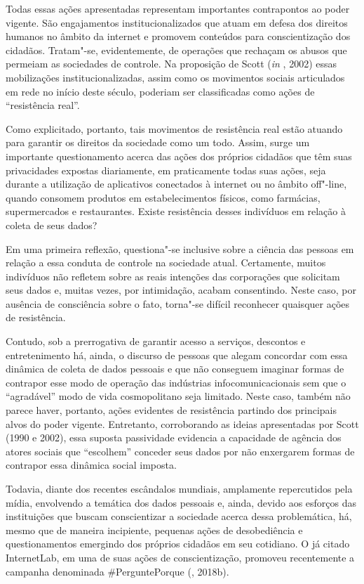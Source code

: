Todas essas ações apresentadas representam importantes contrapontos ao
poder vigente. São engajamentos institucionalizados que atuam em defesa
dos direitos humanos no âmbito da internet e promovem conteúdos para
conscientização dos cidadãos. Tratam"-se, evidentemente, de operações que
rechaçam os abusos que permeiam as sociedades de controle. Na proposição
de Scott (\emph{in} , 2002) essas mobilizações
institucionalizadas, assim como os movimentos sociais articulados em
rede no início deste século, poderiam ser classificadas como ações de
``resistência real''.

Como explicitado, portanto, tais movimentos de resistência real estão
atuando para garantir os direitos da sociedade como um todo. Assim,
surge um importante questionamento acerca das ações dos próprios
cidadãos que têm suas privacidades expostas diariamente, em praticamente
todas suas ações, seja durante a utilização de aplicativos conectados à
internet ou no âmbito off"-line, quando consomem produtos em
estabelecimentos físicos, como farmácias, supermercados e restaurantes.
Existe resistência desses indivíduos em relação à coleta de seus dados?

Em uma primeira reflexão, questiona"-se inclusive sobre a ciência das
pessoas em relação a essa conduta de controle na sociedade atual.
Certamente, muitos indivíduos não refletem sobre as reais intenções das
corporações que solicitam seus dados e, muitas vezes, por intimidação,
acabam consentindo. Neste caso, por ausência de consciência sobre o
fato, torna"-se difícil reconhecer quaisquer ações de resistência.

Contudo, sob a prerrogativa de garantir acesso a serviços, descontos e
entretenimento há, ainda, o discurso de pessoas que alegam concordar com
essa dinâmica de coleta de dados pessoais e que não conseguem imaginar
formas de contrapor esse modo de operação das indústrias
infocomunicacionais sem que o ``agradável'' modo de vida cosmopolitano
seja limitado. Neste caso, também não parece haver, portanto, ações
evidentes de resistência partindo dos principais alvos do poder vigente.
Entretanto, corroborando as ideias apresentadas por Scott (1990 e 2002),
essa suposta passividade evidencia a capacidade de agência dos atores
sociais que ``escolhem'' conceder seus dados por não enxergarem formas
de contrapor essa dinâmica social imposta.

Todavia, diante dos recentes escândalos mundiais, amplamente
repercutidos pela mídia, envolvendo a temática dos dados pessoais e,
ainda, devido aos esforços das instituições que buscam conscientizar a
sociedade acerca dessa problemática, há, mesmo que de maneira
incipiente, pequenas ações de desobediência e questionamentos emergindo
dos próprios cidadãos em seu cotidiano. O já citado InternetLab, em uma
de suas ações de conscientização, promoveu recentemente a campanha
denominada \#PerguntePorque (, 2018b).

